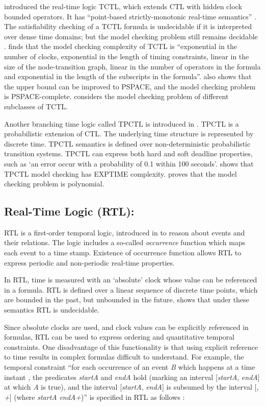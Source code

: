 \documentclass[11pt]{article}
\begin{document}
\cite{ACD90} introduced the real-time logic TCTL, which extends CTL with hidden clock bounded operators. It has ``point-based strictly-monotonic real-time semantics'' \cite{AHT92}.  The satisfiability checking of a TCTL formula is undecidable if it is interpreted over dense time domains; but the model checking problem still remains decidable \cite{ACD90}. \cite{ACD90} finds that the model checking complexity of TCTL is ``exponential in the number of clocks, exponential in the length of timing constraints, linear in the size of the node-transition graph, linear in the number of operators in the formula and exponential in the length of the subscripts in the formula''. \cite{ACD90} also shows that the upper bound can be improved to PSPACE, and the model checking problem is PSPACE-complete. \cite{LMS04} considers the model checking problem of different subclasses of TCTL. 

Another branching time logic called TPCTL is introduced in \cite{Han91}. TPCTL is a probabilistic extension of CTL. The underlying time structure is represented by discrete time. TPCTL semantics is defined over non-deterministic probabilistic transition systems. TPCTL can express both hard and soft deadline properties, such as
`an error occur with a probability of 0.1 within 100 seconds'.  \cite{Han91} shows that TPCTL model checking has EXPTIME complexity. \cite{BS98} proves that the model checking problem is polynomial.

\subsection{Real-Time Logic (RTL)\label{sub:Real-Time-Logic-(RTL):}: }

RTL is a first-order temporal logic, introduced in \cite{JM86} to reason about events and their relations. The logic includes a so-called \emph{occurrence} function which maps each event to a time stamp. Existence of occurrence function allows RTL to express periodic and non-periodic real-time properties.

In RTL, time is measured with an `absolute' clock whose value can be referenced in a formula.  RTL is defined over a linear sequence of discrete time points, which are bounded in the past, but unbounded in the future. \cite{AH90} shows that under these semantics RTL is undecidable. 

Since absolute clocks are used, and clock values can be explicitly referenced in formulas, RTL can be used to express ordering and quantitative temporal constraints.  One disadvantage of this functionality is that using explicit reference to time results in complex formulas difficult to understand.  For example, the temporal constraint ``for each occurrence of an event \emph{B} which happens at a time instant \emph{,} the predicates \emph{startA} and \emph{endA} hold (marking an interval {[}\emph{startA}, \emph{endA}] at which \emph{A} is true), and the interval {[}\emph{startA}, \emph{endA}] is subsumed by the interval {[}\emph{}, \emph{+}] (where \emph{}\emph{startA}  \emph{endA}\emph{+})''  is specified in RTL as follows \cite{BMN00}:
\end{document}
